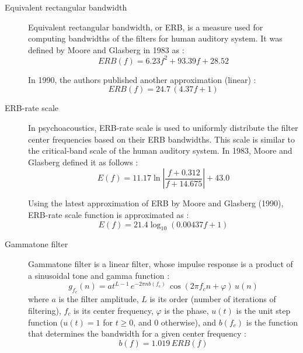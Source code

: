\begin{description}
	\item[Equivalent rectangular bandwidth] Equivalent rectangular bandwidth, or ERB, is a measure used for computing bandwidths of the filters for human auditory system. It was defined by Moore and Glasberg in 1983 as \cite{Moore1983}\cite{Holdsworth1988}:
	\begin{equation}
		ERB(f) = 6.23f^2 + 93.39f + 28.52
	\end{equation} 
	
	In 1990, the authors published another approximation (linear) \cite{Moore1990}\cite{Wang2006}:
	\begin{equation}
		ERB(f) = 24.7\,(4.37f + 1)
	\end{equation}
	
	\item[ERB-rate scale] In psychoacoustics, ERB-rate scale is used to uniformly distribute the filter center frequencies based on their ERB bandwidths. This scale is similar to the critical-band scale of the human auditory system. In 1983, Moore and Glasberg defined it as follows \cite{Moore1983}:
	\begin{equation}
		E(f) = 11.17\ln\left|\frac{f + 0.312}{f + 14.675}\right| + 43.0
	\end{equation}
	
	Using the latest approximation of ERB by Moore and Glasberg (1990), ERB-rate scale function is approximated as \cite{Moore1990}\cite{Wang2006}:
	\begin{equation}
		E(f) = 21.4\log_{10}\left(0.00437f + 1\right)
	\end{equation}
	
	\item[Gammatone filter] Gammatone filter is a linear filter, whose impulse response is a product of a sinusoidal tone and gamma function \cite{Wang2006}:
	\begin{equation}
		g_{f_c}(n) = at^{L-1}\,e^{-2\pi{}nb(f_c)}\,\cos(2\pi{}f_c{}n + \varphi)\,u(n)
	\end{equation}
	where $a$ is the filter amplitude, $L$ is its order (number of iterations of filtering), $f_c$ is its center frequency, $\varphi$ is the phase, $u(t)$ is the unit step function ($u(t) = 1$ for $t \ge 0$, and $0$ otherwise), and $b(f_c)$ is the function that determines the bandwidth for a given center frequency \cite{Wang2006}:
	\begin{equation}
		b(f) = 1.019\,ERB(f)
	\end{equation}
	

\end{description}
